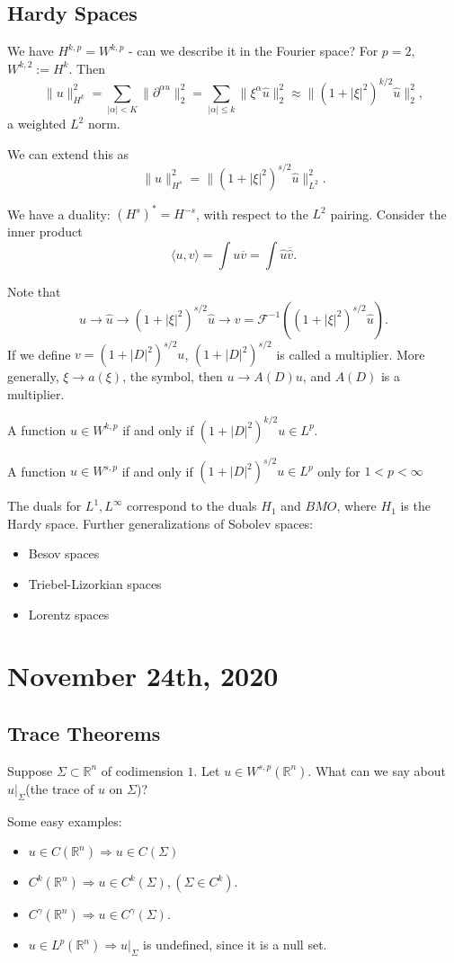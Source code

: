 \documentclass[12pt]{scrartcl}
\newcommand{\R}{\mathbb{R}}
\renewcommand{\hat}{\widehat}
\begin{document}
\subsection{Hardy Spaces}
We have $H^{k, p} = W^{k, p}$ - can we describe it in the Fourier space?
For $p=2$, $W^{k, 2} := H^k$.  Then 
$$\|u\|_{H^k}^2 = \sum_{|\alpha| < K}\|\partial^{\alpha u}\|_2^2 = \sum_{|\alpha| \le k} \| \xi^{\alpha} \hat{u}\|_{2}^2 \approx \|(1 + |\xi|^2)^{k/2} \hat{u}\|_2^2,$$
a weighted $L^2$ norm.

We can extend this as 
$$\|u\|_{H^s}^2 = \|(1 + |\xi|^2)^{s/2} \hat{u}\|_{L^2}^2.$$

We have a duality: $(H^s)^* = H^{-s}$, with respect to the $L^2$ pairing.
Consider the inner product 
$$\langle u, v\rangle = \int u \overline{v} = \int \hat{u} \overline{\hat v}.$$

Note that 
$$u \to \hat{u} \to (1 + |\xi|^2)^{s/2}\hat{u} \to v =\mathcal{F}^{-1}( (1 + |\xi|^2)^{s/2} \hat{u}).$$
If we define $v = (1 + |D|^2)^{s/2} u$, $(1 + |D|^2)^{s/2}$ is called a multiplier.  More generally, $\xi \to a(\xi)$, the symbol, then $u \to A(D) u$, and $A(D)$ is a multiplier.

\begin{proposition}
A function $u \in W^{k, p}$ if and only if $(1 + |D|^2)^{k/2} u \in L^p$.

A function $u \in W^{s,p}$ if and only if $(1 + |D|^2)^{s/2} u \in L^p$ only for $1 < p < \infty$
\end{proposition}
The duals for $L^1, L^{\infty}$ correspond to the duals $H_1$ and $BMO$, where $H_1$ is the Hardy space.
Further generalizations of Sobolev spaces:
\begin{itemize}
\item Besov spaces
\item Triebel-Lizorkian spaces
\item Lorentz spaces
\end{itemize}
\pagebreak
\section{November 24th, 2020}
\subsection{Trace Theorems}
Suppose $\Sigma \subset \R^n$ of codimension $1$.  Let $u \in W^{s, p}(\R^n)$.  What can we say about $u\vert_{\Sigma}$(the trace of $u$ on $\Sigma$)?

Some easy examples:
\begin{itemize}
\item $u \in C(\R^n) \Rightarrow u \in C(\Sigma)$
\item $C^k(\R^n) \Rightarrow u \in C^k(\Sigma), (\Sigma \in C^k)$.
\item $C^{\gamma}(\R^n) \Rightarrow u \in C^\gamma(\Sigma)$.
\item $u \in L^p(\R^n) \Rightarrow u\vert_{\Sigma}$ is undefined, since it is a null set.  
\end{itemize}
\end{document}
